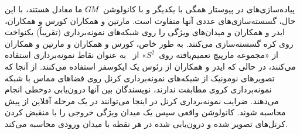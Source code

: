 پیاده‌سازی‌های \cite{coors2018spherenet,zhao2018distortion,tateno2018distortion,eder2019convolutions,martin2020panoramic}
در پیوستار همگی با یکدیگر و با کانولوشن $G\mkern-1.4muM$ ما معادل هستند، با این حال، گسسته‌سازی‌های عددی آنها متفاوت است.
مارتین و همکاران \cite{coors2018spherenet} کورس و همکاران، \cite{eder2019convolutions} ایدر و همکاران و \cite{martin2020panoramic} میدان‌های ویژگی را روی شبکه‌های نمونه‌برداری (تقریباً) یکنواخت روی کره گسسته‌سازی می‌کنند.
به طور خاص، کورس و همکاران \cite{coors2018spherenet} و مارتین و همکاران \cite{martin2020panoramic} از «مجموعه مارپیچ تعمیم‌یافته روی~$S^2$» از~\cite{saff1997distributing} به عنوان نقاط نمونه‌برداری استفاده می‌کنند، در حالی که ایدر و همکاران\cite{eder2019convolutions}  از رئوس یک ایکوسفر استفاده می‌کنند.
از آنجا که تصویرهای نومونیک از شبکه‌های نمونه‌برداری کرنل روی فضاهای مماس با شبکه نمونه‌برداری کروی مطابقت ندارند، نویسندگان بین آنها درون‌یابی دوخطی انجام می‌دهند.
ضرایب نمونه‌برداری کرنل در اینجا می‌توانند در یک مرحله آفلاین از پیش محاسبه شوند.
کانولوشن واقعی سپس یک میدان ویژگی خروجی را با منقبض کردن کرنل‌های تصویر شده و درون‌یابی شده در هر نقطه با میدان ورودی محاسبه می‌کند.


